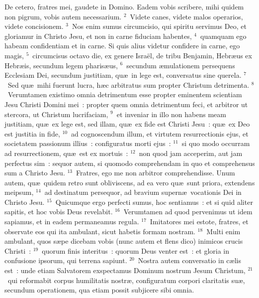 \lettrine[lines=3,image=true,loversize=0.05,lraise=-0.03]{D}{}e cetero, fratres mei, gaudete in Domino. Eadem vobis scribere, mihi quidem non pigrum, vobis autem necessarium.
${}^{2}$~Videte canes, videte malos operarios, videte concisionem.
${}^{3}$~Nos enim sumus circumcisio, qui spiritu servimus Deo, et gloriamur in Christo Jesu, et non in carne fiduciam habentes,
${}^{4}$~quamquam ego habeam confidentiam et in carne. Si quis alius videtur confidere in carne, ego magis,
${}^{5}$~circumcisus octavo die, ex genere Isra\"el, de tribu Benjamin, Hebr\ae us ex Hebr\ae is, secundum legem pharis\ae us,
${}^{6}$~secundum \ae mulationem persequens Ecclesiam Dei, secundum justitiam, qu\ae\ in lege est, conversatus sine querela.
${}^{7}$~Sed qu\ae\ mihi fuerunt lucra, h\ae c arbitratus sum propter Christum detrimenta.
${}^{8}$~Verumtamen existimo omnia detrimentum esse propter eminentem scientiam Jesu Christi Domini mei~: propter quem omnia detrimentum feci, et arbitror ut stercora, ut Christum lucrifaciam,
${}^{9}$~et inveniar in illo non habens meam justitiam, qu\ae\ ex lege est, sed illam, qu\ae\ ex fide est Christi Jesu~: qu\ae\ ex Deo est justitia in fide,
${}^{10}$~ad cognoscendum illum, et virtutem resurrectionis ejus, et societatem passionum illius~: configuratus morti ejus~:
${}^{11}$~si quo modo occurram ad resurrectionem, qu\ae\ est ex mortuis~:
${}^{12}$~non quod jam acceperim, aut jam perfectus sim~: sequor autem, si quomodo comprehendam in quo et comprehensus sum a Christo Jesu.
${}^{13}$~Fratres, ego me non arbitror comprehendisse. Unum autem, qu\ae\ quidem retro sunt obliviscens, ad ea vero qu\ae\ sunt priora, extendens meipsum,
${}^{14}$~ad destinatum persequor, ad bravium supern\ae\ vocationis Dei in Christo Jesu.
${}^{15}$~Quicumque ergo perfecti sumus, hoc sentiamus~: et si quid aliter sapitis, et hoc vobis Deus revelabit.
${}^{16}$~Verumtamen ad quod pervenimus ut idem sapiamus, et in eadem permaneamus regula.
${}^{17}$~Imitatores mei estote, fratres, et observate eos qui ita ambulant, sicut habetis formam nostram.
${}^{18}$~Multi enim ambulant, quos s\ae pe dicebam vobis (nunc autem et flens dico) inimicos crucis Christi~:
${}^{19}$~quorum finis interitus~: quorum Deus venter est~: et gloria in confusione ipsorum, qui terrena sapiunt.
${}^{20}$~Nostra autem conversatio in c\ae lis est~: unde etiam Salvatorem exspectamus Dominum nostrum Jesum Christum,
${}^{21}$~qui reformabit corpus humilitatis nostr\ae , configuratum corpori claritatis su\ae , secundum operationem, qua etiam possit subjicere sibi omnia.

